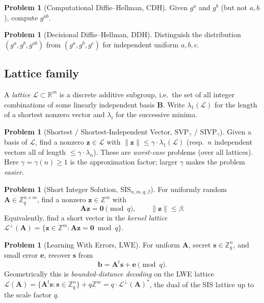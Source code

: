 \documentclass[11pt]{article}
\theoremstyle{definition}
\newtheorem{problem}[definition]{Problem}
\theoremstyle{plain}
\theoremstyle{remark}
\newcommand{\Z}{\mathbb{Z}}
\newcommand{\R}{\mathbb{R}}
\newcommand{\Zq}{\Z_q}
\newcommand{\vA}{\mathbf{A}}
\newcommand{\vB}{\mathbf{B}}
\newcommand{\vs}{\mathbf{s}}
\newcommand{\ve}{\mathbf{e}}
\newcommand{\vb}{\mathbf{b}}
\newcommand{\vz}{\mathbf{z}}
\newcommand{\vzero}{\mathbf{0}}
\newcommand{\lat}{\mathcal{L}}
\newcommand{\cdh}{\mathrm{CDH}}
\newcommand{\ddh}{\mathrm{DDH}}
\newcommand{\lwe}{\mathrm{LWE}}
\newcommand{\sis}{\mathrm{SIS}}
\newcommand{\svp}{\mathrm{SVP}}
\newcommand{\sivp}{\mathrm{SIVP}}
\newcommand{\norm}[1]{\lVert #1 \rVert}
\newcommand{\lamone}{\lambda_1}
\begin{document}
\begin{problem}[Computational Diffie--Hellman, $\cdh$]
Given $g^a$ and $g^b$ (but not $a,b$), compute $g^{ab}$.
\end{problem}

\begin{problem}[Decisional Diffie--Hellman, $\ddh$]
Distinguish the distribution $(g^a, g^b, g^{ab})$ from $(g^a, g^b, g^c)$ for independent
uniform $a,b,c$.
\end{problem}

\subsection{Lattice family}

A \emph{lattice} $\lat \subset \R^m$ is a discrete additive subgroup, i.e.\ the set of all
integer combinations of some linearly independent basis $\vB$. Write $\lamone(\lat)$ for the
length of a shortest nonzero vector and $\lambda_i$ for the successive minima.

\begin{problem}[Shortest / Shortest-Independent Vector, $\svp_\gamma$ / $\sivp_\gamma$]
Given a basis of $\lat$, find a nonzero $\vz\in\lat$ with $\norm{\vz}\le\gamma\cdot\lamone(\lat)$
(resp.\ $n$ independent vectors all of length $\le\gamma\cdot\lambda_n$). These are
\emph{worst-case} problems (over all lattices). Here $\gamma=\gamma(n)\ge 1$ is the
approximation factor; larger $\gamma$ makes the problem \emph{easier}.
\end{problem}

\begin{problem}[Short Integer Solution, $\sis_{n,m,q,\beta}$]
For uniformly random $\vA \in \Zq^{n\times m}$, find a nonzero $\vz \in \Z^m$ with
\[
   \vA\vz = \vzero \pmod q, \qquad \norm{\vz}\le\beta .
\]
Equivalently, find a short vector in the \emph{kernel lattice}
$\lat^{\perp}(\vA) = \{\vz\in\Z^m : \vA\vz = \vzero \bmod q\}$.
\end{problem}

\begin{problem}[Learning With Errors, $\lwe$]
For uniform $\vA$, secret $\vs\in\Zq^n$, and small error $\ve$, recover $\vs$ from
\[
   \vb = \vA^{t}\vs + \ve \pmod q .
\]
Geometrically this is \emph{bounded-distance decoding} on the LWE lattice
$\lat(\vA) = \{\vA^t\vs : \vs\in\Zq^n\} + q\Z^m = q\cdot\lat^\perp(\vA)^{*}$,
the dual of the SIS lattice up to the scale factor $q$.
\end{problem}
\end{document}
